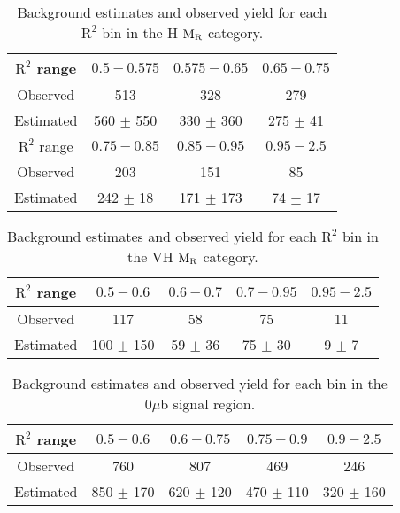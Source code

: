 {{{\begin{table}[h!]
\begin{center}
\end{center}
\end{table}
\newpage
\begin{table}[h!]
\begin{center}
  \caption{\label{tab:LOOKUP_H} Background estimates and observed
    yield for each $\mathrm{R}^2$ bin in the H $\mathrm{M_{\rm R}}$
    category.}
\begin{tabular}{|c|c|c|c|} 
  \hline
  $\mathrm{R^2}$ range & $0.5-0.575$ &  $0.575-0.65$ &  $0.65-0.75$  \\
  \hline
  Observed & 513 & 328 & 279 \\
  \hline
  Estimated & 560 $\pm$ 550 & 330 $\pm$ 360 & 275 $\pm$ 41 \\
  \hline
  \hline
  $\mathrm{R^2}$ range & $0.75-0.85$ &  $0.85-0.95$ &  $0.95-2.5$  \\
  \hline
  Observed & 203 & 151 & 85  \\
  \hline
  Estimated & 242 $\pm$ 18 & 171 $\pm$ 173 & 74 $\pm$ 17 \\
  \hline
  \hline
\end{tabular}
\end{center}
\end{table}
\begin{table}[h!]
\begin{center}
  \caption{\label{tab:LOOKUP_VH} Background estimates and observed
    yield for each $\mathrm{R}^2$ bin in the VH $\mathrm{M_{\rm R}}$
    category.}
\begin{tabular}{|c|c|c|c|c|} 
  \hline
  $\mathrm{R^2}$ range & $0.5-0.6$ &  $0.6-0.7$ &  $0.7-0.95$ & $0.95-2.5$ \\
  \hline
  Observed & 117 & 58 & 75 & 11 \\
  \hline
  Estimated & 100 $\pm$ 150 & 59 $\pm$ 36 & 75 $\pm$ 30 & 9 $\pm$ 7 \\
  \hline
\end{tabular}
\end{center}
\end{table}
\begin{table}[h!]
\begin{center}
  \caption{\label{tab:LOOKUP_B}Background estimates and observed
    yield for each bin in the $0\mu$b signal region.}
\begin{tabular}{|c|c|c|c|c|} 
  \hline
  $\mathrm{R^2}$ range & $0.5-0.6$ &  $0.6-0.75$ &  $0.75-0.9$ & $0.9-2.5$ \\
  \hline
  Observed & 760 & 807 & 469 & 246 \\
  \hline
  Estimated & 850 $\pm$ 170 & 620 $\pm$ 120 & 470 $\pm$ 110 & 320 $\pm$ 160 \\
  \hline
\end{tabular}
\end{center}
\end{table}

}}}
